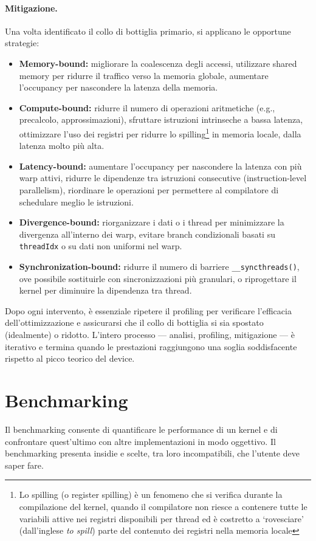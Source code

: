 \paragraph{Mitigazione.} Una volta identificato il collo di bottiglia primario, si applicano le opportune strategie:
\begin{itemize}
    \item \textbf{Memory-bound:} migliorare la coalescenza degli accessi, utilizzare shared memory per ridurre il traffico verso la memoria globale, aumentare l'occupancy per nascondere la latenza della memoria.
    \item \textbf{Compute-bound:} ridurre il numero di operazioni aritmetiche (e.g., precalcolo, approssimazioni), sfruttare istruzioni intrinseche a bassa latenza, ottimizzare l'uso dei registri per ridurre lo spilling\footnote{Lo spilling (o register spilling) è un fenomeno che si verifica durante la compilazione del kernel, quando il compilatore non riesce a contenere tutte le variabili attive nei registri disponibili per thread ed è costretto a `rovesciare' (dall'inglese \emph{to spill}) parte del contenuto dei registri nella memoria locale} in memoria locale, dalla latenza molto più alta.
    \item \textbf{Latency-bound:} aumentare l'occupancy per nascondere la latenza con più warp attivi, ridurre le dipendenze tra istruzioni consecutive (instruction-level parallelism), riordinare le operazioni per permettere al compilatore di schedulare meglio le istruzioni.
    \item \textbf{Divergence-bound:} riorganizzare i dati o i thread per minimizzare la divergenza all'interno dei warp, evitare branch condizionali basati su \texttt{threadIdx} o su dati non uniformi nel warp.
    \item \textbf{Synchronization-bound:} ridurre il numero di barriere \texttt{\_\_syncthreads()}, ove possibile sostituirle con sincronizzazioni più granulari, o riprogettare il kernel per diminuire la dipendenza tra thread.
\end{itemize}
Dopo ogni intervento, è essenziale ripetere il profiling per verificare l'efficacia dell'ottimizzazione e assicurarsi che il collo di bottiglia si sia spostato (idealmente) o ridotto. L'intero processo --- analisi, profiling, mitigazione --- è iterativo e termina quando le prestazioni raggiungono una soglia soddisfacente rispetto al picco teorico del device.

\section{Benchmarking}
Il benchmarking consente di quantificare le performance di un kernel e di confrontare quest'ultimo con altre implementazioni in modo oggettivo.
Il benchmarking presenta insidie e scelte, tra loro incompatibili, che l'utente deve saper fare.

